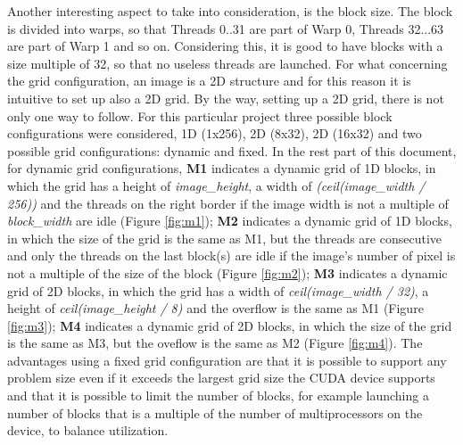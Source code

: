 \documentclass[a4paper]{article}
\begin{document}
Another interesting aspect to take into consideration, is the block size. The block is divided into warps, so that Threads 0..31 are part of Warp 0, Threads 32...63 are part of Warp 1 and so on. Considering this, it is good to have blocks with a size multiple of 32, so that no useless threads are launched. For what concerning the grid configuration, an image is a 2D structure and for this reason it is intuitive to set up also a 2D grid. By the way, setting up a 2D grid, there is not only one way to follow. For this particular project three possible block configurations were considered, 1D (1x256), 2D (8x32), 2D (16x32) and two possible grid configurations: dynamic and fixed. In the rest part of this document, for dynamic grid configurations, \textbf{M1} indicates a dynamic grid of 1D blocks, in which the grid has a height of \textit{image\_height}, a width of \textit{(ceil(image\_width / 256))} and the threads on the right border if the image width is not a multiple of \textit{block\_width} are idle (Figure \ref{fig:m1}); \textbf{M2} indicates a dynamic grid of 1D blocks, in which the size of the grid is the same as M1, but the threads are consecutive and only the threads on the last block(s) are idle if the image's number of pixel is not a multiple of the size of the block (Figure \ref{fig:m2}); \textbf{M3} indicates a dynamic grid of 2D blocks, in which the grid has a width of \textit{ceil(image\_width / 32)}, a height of \textit{ceil(image\_height / 8)} and the overflow is the same as M1 (Figure \ref{fig:m3}); \textbf{M4} indicates a dynamic grid of 2D blocks, in which the size of the grid is the same as M3, but the oveflow is the same as M2 (Figure \ref{fig:m4}). The advantages using a fixed grid configuration are that it is possible to support any problem size even if it exceeds the largest grid size the CUDA device supports and that it is possible to limit the number of blocks, for example launching a number of blocks that is a multiple of the number of multiprocessors on the device, to balance utilization.
\end{document}
